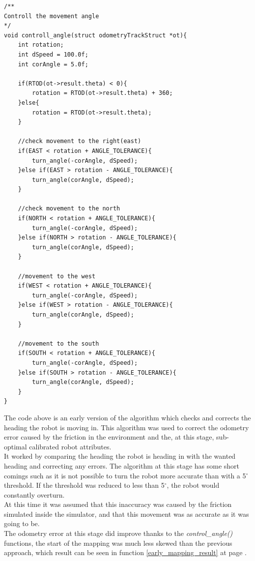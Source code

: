 \begin{lstlisting}[caption={Early heading correction algorithm}, label={early_heading}]
/**
Controll the movement angle
*/
void controll_angle(struct odometryTrackStruct *ot){
    int rotation;
    int dSpeed = 100.0f;
    int corAngle = 5.0f;

    if(RTOD(ot->result.theta) < 0){
        rotation = RTOD(ot->result.theta) + 360;
    }else{
        rotation = RTOD(ot->result.theta);
    }

    //check movement to the right(east)
    if(EAST < rotation + ANGLE_TOLERANCE){
        turn_angle(-corAngle, dSpeed);
    }else if(EAST > rotation - ANGLE_TOLERANCE){
        turn_angle(corAngle, dSpeed);
    }

    //check movement to the north
    if(NORTH < rotation + ANGLE_TOLERANCE){
        turn_angle(-corAngle, dSpeed);
    }else if(NORTH > rotation - ANGLE_TOLERANCE){
        turn_angle(corAngle, dSpeed);
    }

    //movement to the west
    if(WEST < rotation + ANGLE_TOLERANCE){
        turn_angle(-corAngle, dSpeed);
    }else if(WEST > rotation - ANGLE_TOLERANCE){
        turn_angle(corAngle, dSpeed);
    }

    //movement to the south
    if(SOUTH < rotation + ANGLE_TOLERANCE){
        turn_angle(-corAngle, dSpeed);
    }else if(SOUTH > rotation - ANGLE_TOLERANCE){
        turn_angle(corAngle, dSpeed);
    }
}
\end{lstlisting}
The code above is an early version of the algorithm which checks and corrects the heading the robot is moving in. This algorithm was used to correct the odometry error caused by the friction in the environment and the, at this stage, sub-optimal calibrated robot attributes. \\
It worked by comparing the heading the robot is heading in with the wanted heading and correcting any errors. The algorithm at this stage has some short comings such as it is not possible to turn the robot more accurate than with a 5$^{\circ}$ threshold. If the threshold was reduced to less than  5$^{\circ}$, the robot would constantly overturn. \\[3ex]

At this time it was assumed that this inaccuracy was caused by the friction simulated inside the simulator, and that this movement was as accurate as it was going to be. \\
The odometry error at this stage did improve thanks to the \textit{control\_angle()} functions, the start of the mapping was much less skewed than the previous approach, which result can be seen in function \ref{early_mapping_result} at page \pageref{early_mapping_result}. \\[3ex]

